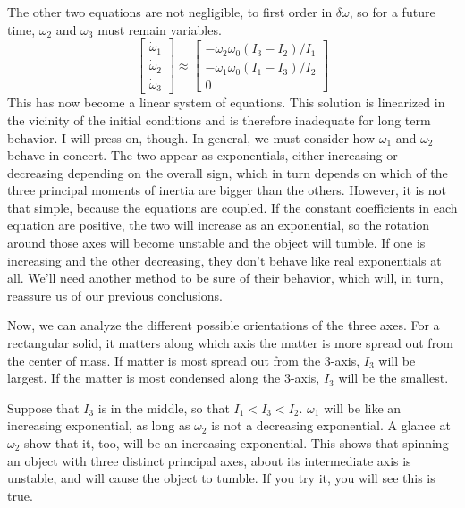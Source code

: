 \documentclass[10pt]{article}
\begin{document}
The other two equations are not negligible, to first order in $\delta\omega$, 
so for a future time, $\omega_2$ and $\omega_3$ must remain variables.
\begin{equation}
    \begin{bmatrix}
       \dot{\omega}_1 \\
       \dot{\omega}_2 \\
       \dot{\omega}_3
    \end{bmatrix}
        \approx
        \begin{bmatrix}
            -\omega_2\omega_0(I_3 - I_2)/I_1 \\
            -\omega_1\omega_0(I_1 - I_3)/I_2 \\
            0
        \end{bmatrix} \label{eulerfreesimp}
\end{equation}
This has now become a linear system of equations. 
This solution is linearized in the vicinity of the 
initial conditions and is therefore inadequate for long term behavior.
I will press on, though. In general, we must consider 
how $\omega_1$ and $\omega_2$ behave in concert. The two appear 
as exponentials, either increasing or decreasing depending on 
the overall sign, which in turn depends on which of the three principal 
moments of inertia are bigger than the others. However, it is not 
that simple, because the equations are coupled. If the constant coefficients 
in each equation are positive, the two will increase as an exponential, so 
the rotation around those axes will become unstable and the object 
will tumble. If one is increasing and the other decreasing, they don't 
behave like real exponentials at all. We'll need another method to 
be sure of their behavior, which will, in turn, reassure us of our previous 
conclusions.

Now, we can analyze the different possible orientations of the three axes.
For a rectangular solid, it matters along which axis the matter is more 
spread out from the center of mass. If matter is most spread out 
from the $3$-axis, $I_3$ will be largest. If the matter 
is most condensed along the $3$-axis, $I_3$ will be the smallest.

Suppose that $I_3$ is in the middle, so that $I_1<I_3<I_2$. $\omega_1$ will 
be like an increasing exponential, as long as $\omega_2$ is not a decreasing 
exponential. A glance at $\omega_2$ show that it, too, will be an increasing 
exponential. This shows that spinning an object with three distinct 
principal axes, about its intermediate axis is unstable, and will 
cause the object to tumble. If you try it, you will see this is true.
\end{document}
